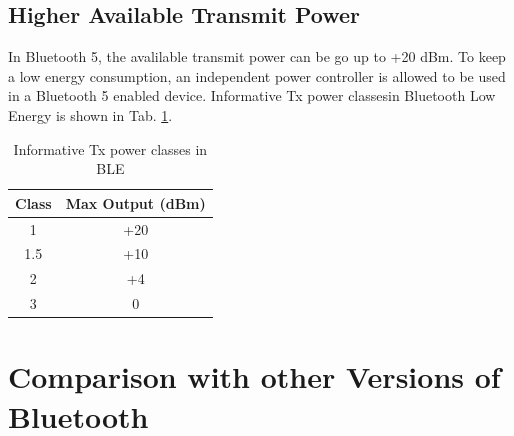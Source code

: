 \documentclass[journal, a4paper]{IEEEtran}
\begin{document}
\subsection{Higher Available Transmit Power}

In Bluetooth 5, the avalilable transmit power can be go up to +20 dBm. To keep a low energy consumption, an independent power controller is allowed to be used in a Bluetooth 5 enabled device. Informative Tx power classesin Bluetooth Low Energy is shown in Tab. \ref{table:power-classes}.

\begin{table}[h!]
\caption{Informative Tx power classes in BLE}
\label{table:power-classes}
\centering

\begin{tabular}{||c| c||} 
 \hline
 Class & Max Output (dBm) \\ %
 \hline\hline
 1 & +20 \\ %
 \hline
 1.5 & +10 \\ %
 \hline
 2 & +4 \\ %
 \hline
 3 & 0 \\ %
 \hline
\end{tabular}


\end{table}


\section{Comparison with other Versions of Bluetooth}
\end{document}
